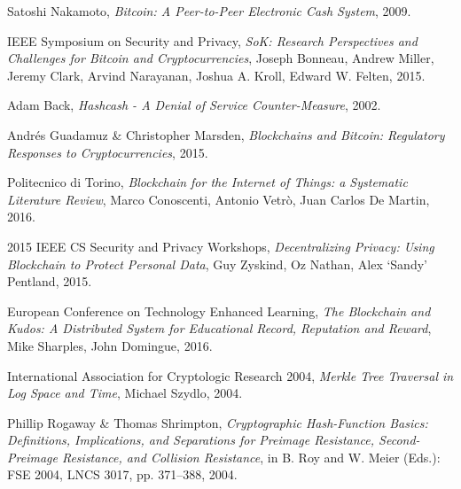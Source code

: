 %
%
%
\begin{thebibliography}{1}

  Satoshi Nakamoto,
  \emph{Bitcoin: A Peer-to-Peer Electronic Cash System},
  2009.

  IEEE Symposium on Security and Privacy,
  \emph{SoK: Research Perspectives and Challenges for Bitcoin and
Cryptocurrencies},
  Joseph Bonneau, Andrew Miller, Jeremy Clark, Arvind Narayanan, Joshua
A. Kroll, Edward W. Felten,
  2015.

  Adam Back,
  \emph{Hashcash - A Denial of Service Counter-Measure},
  2002.

  Andrés Guadamuz \& Christopher Marsden,
  \emph{Blockchains and Bitcoin: Regulatory Responses to Cryptocurrencies},
  2015.

  Politecnico di Torino,
  \emph{Blockchain for the Internet of Things: a Systematic Literature Review},
  Marco Conoscenti, Antonio Vetrò, Juan Carlos De Martin,
  2016.

  2015 IEEE CS Security and Privacy Workshops,
  \emph{Decentralizing Privacy: Using Blockchain to Protect Personal Data},
  Guy Zyskind, Oz Nathan, Alex `Sandy' Pentland,
  2015.

  European Conference on Technology Enhanced Learning,
  \emph{The Blockchain and Kudos: A Distributed System for Educational Record,
Reputation and Reward},
  Mike Sharples, John Domingue,
  2016.

  International Association for Cryptologic Research 2004,
  \emph{Merkle Tree Traversal in Log Space and Time},
  Michael Szydlo,
  2004.

  Phillip Rogaway \& Thomas Shrimpton,
  \emph{Cryptographic Hash-Function Basics: Definitions, Implications, and
Separations for Preimage Resistance, Second-Preimage Resistance, and Collision
Resistance},
  in B. Roy and W. Meier (Eds.): FSE 2004, LNCS 3017, pp. 371–388,
  2004.


\end{thebibliography}
